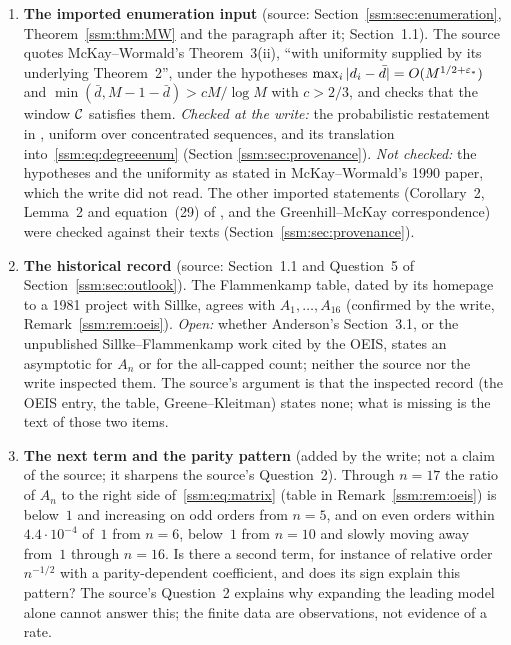 \begin{enumerate}
\item\label{ssm:q:inputs} \textbf{The imported enumeration input} (source:
 Section~\ref{ssm:sec:enumeration}, Theorem~\ref{ssm:thm:MW} and the
 paragraph after it; Section~1.1). The source quotes McKay--Wormald's
 Theorem~3(ii), ``with uniformity supplied by its underlying Theorem~2'',
 under the hypotheses $\max_i|d_i-\bar d|=O(M^{1/2+\varepsilon_*})$ and
 $\min(\bar d,M-1-\bar d)>cM/\log M$ with $c>2/3$, and checks that the
 window $\mathcal C$ satisfies them. \emph{Checked at the write:} the probabilistic
 restatement in \cite[(17)--(18)]{mww}, uniform over concentrated
 sequences, and its translation into~\eqref{ssm:eq:degreeenum} (Section
 \ref{ssm:sec:provenance}). \emph{Not checked:} the hypotheses and the
 uniformity as stated in McKay--Wormald's 1990 paper, which the write did
 not read. The other imported statements (Corollary~2, Lemma~2 and
 equation~(29) of \cite{mww}, and the Greenhill--McKay correspondence) were
 checked against their texts (Section~\ref{ssm:sec:provenance}).
\item\label{ssm:q:history} \textbf{The historical record} (source:
 Section~1.1 and Question~5 of Section~\ref{ssm:sec:outlook}). The
 Flammenkamp table, dated by its homepage to a 1981 project with Sillke,
 agrees with $A_1,\ldots,A_{16}$ (confirmed by the write,
 Remark~\ref{ssm:rem:oeis}). \emph{Open:} whether Anderson's Section~3.1, or
 the unpublished Sillke--Flammenkamp work cited by the OEIS, states an
 asymptotic for $A_n$ or for the all-capped count; neither the source nor
 the write inspected them. The source's argument is that the inspected
 record (the OEIS entry, the table, Greene--Kleitman) states none; what is
 missing is the text of those two items.
\item\label{ssm:q:parity} \textbf{The next term and the parity pattern}
 (added by the write; not a claim of the source; it sharpens the source's
 Question~2). Through $n=17$ the ratio of $A_n$ to the right side
 of~\eqref{ssm:eq:matrix} (table in Remark~\ref{ssm:rem:oeis}) is below~$1$
 and increasing on odd orders from $n=5$, and on even orders within
 $4.4\cdot10^{-4}$ of~$1$ from $n=6$, below~$1$ from $n=10$ and slowly moving away
 from~$1$ through $n=16$. Is there a second term, for instance of relative
 order $n^{-1/2}$ with a parity-dependent coefficient, and does its sign
 explain this pattern? The source's Question~2 explains why expanding the
 leading model alone cannot answer this; the finite data are observations,
 not evidence of a rate.
\end{enumerate}
